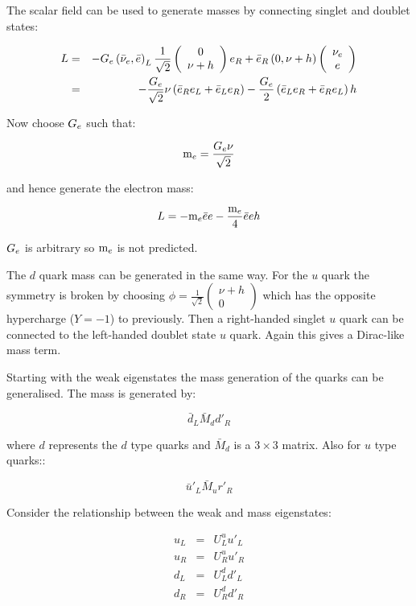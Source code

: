 The scalar field can be used to generate masses by connecting singlet and doublet states:

\begin{eqnarray*}
  L & = & -G_{e} \left( \bar{\nu}_{e} , \bar{e}\right)_L\frac{1}{\sqrt{2}}
  \left(
  \begin{array}{c}
    0 \\
    \nu + h
  \end{array}
  \right)
  e_R + \bar{e}_R\left(0 , \nu + h \right)
  \left(
  \begin{array}{c}
    \nu_{e} \\
    e
  \end{array}
  \right)
  \\
  & = & -\frac{G_{e}}{\sqrt{2}}\nu\left(\bar{e}_Re_L + \bar{e}_Le_R\right) - \frac{G_{e}}{2}\left(\bar{e}_Le_R + \bar{e}_Re_L\right)h
\end{eqnarray*}

Now choose $G_{e}$ such that:

\[
  \mathrm{m}_{e} = \frac{G_{e}\nu}{\sqrt{2}}
\]

and hence generate the electron mass:

\[
  L = -\mathrm{m}_{e} \bar{e} e - \frac{\mathrm{m}_{e}}{4} \bar{e}e h
\]

$G_{e}$ is arbitrary so $\mathrm{m}_{e}$ is not predicted.

The $d$ quark mass can be generated in the same way.  For the $u$ quark the symmetry is broken by choosing $\phi = \frac{1}{\sqrt{2}}\left(\begin{array}{c}\nu + h \\ 0 \end{array}\right)$ which has the opposite hypercharge ($Y = -1$) to previously.  Then a right-handed singlet $u$ quark can be connected to the left-handed doublet state $u$ quark.  Again this gives a Dirac-like mass term.

Starting with the weak eigenstates the mass generation of the quarks can be generalised.  The mass is generated by:

\[
  \bar{d}_L \bar{M}_d d'_R
\]

where $d$ represents the $d$ type quarks and $\bar{M}_d$ is a $3 \times 3$ matrix.  Also for $u$ type quarks::

\[
   \bar{u}'_L \bar{M}_u r'_R
\]

Consider the relationship between the weak and mass eigenstates:

\begin{eqnarray*}
  u_L & = & U^u_L u'_L \\
  u_R & = & U^u_R u'_R \\
  d_L & = & U^d_L d'_L \\
  d_R & = & U^d_R d'_R
\end{eqnarray*}

